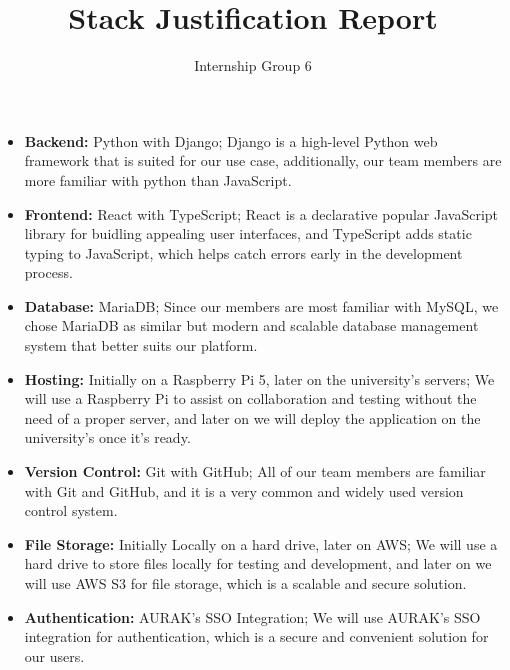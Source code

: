 \documentclass{article}
\title{Stack Justification Report}
\author{Internship Group 6}
\begin{document}
\maketitle
\noindent

\begin{itemize}
    \item \textbf{Backend:} Python with Django; Django is a high-level Python web framework that is suited for our use case, additionally, our team members are more familiar with python than JavaScript.
    \item \textbf{Frontend:} React with TypeScript; React is a declarative popular JavaScript library for buidling appealing user interfaces, and TypeScript adds static typing to JavaScript, which helps catch errors early in the development process.
    \item \textbf{Database:} MariaDB; Since our members are most familiar with MySQL, we chose MariaDB as similar but modern and scalable database management system that better suits our platform.
    \item \textbf{Hosting:} Initially on a Raspberry Pi 5, later on the university's servers; We will use a Raspberry Pi to assist on collaboration and testing without the need of a proper server, and later on we will deploy the application on the university's once it's ready.
    \item \textbf{Version Control:} Git with GitHub; All of our team members are familiar with Git and GitHub, and it is a very common and widely used version control system.
    \item \textbf{File Storage:} Initially Locally on a hard drive, later on AWS; We will use a hard drive to store files locally for testing and development, and later on we will use AWS S3 for file storage, which is a scalable and secure solution.
    \item \textbf{Authentication:} AURAK's SSO Integration; We will use AURAK's SSO integration for authentication, which is a secure and convenient solution for our users.
\end{itemize}
\end{document}
